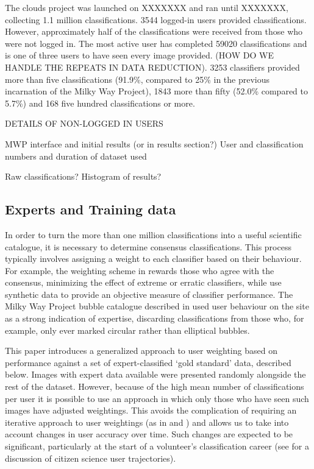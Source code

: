 \documentclass[a4,useAMS,usenatbib]{mn2e}
\begin{document}
The clouds project was launched on XXXXXXX and ran until XXXXXXX, collecting 1.1 million classifications. 3544 logged-in users provided classifications. However, approximately half of the classifications were received from those who were not logged in. The most active user has completed 59020 classifications and is one of three users to have seen every image provided. (HOW DO WE HANDLE THE REPEATS IN DATA REDUCTION). 3253 classifiers provided more than five classifications (91.9\%, compared to 25\% in the previous incarnation of the Milky Way Project), 1843 more than fifty (52.0\% compared to 5.7\%) and 168 five hundred classifications or more. 

DETAILS OF NON-LOGGED IN USERS


MWP interface and initial results (or in results section?)
User and classification numbers and duration of dataset used

Raw classifications?
Histogram of results?


\subsection{Experts and Training data}

In order to turn the more than one million classifications into a useful scientific catalogue, it is necessary to determine consensus classifications. This process typically involves assigning a weight to each classifier based on their behaviour. For example, the weighting scheme in \citet{Lintott} rewards those who agree with the consensus, minimizing the effect of extreme or erratic classifiers, while \citet{Schwamb} use synthetic data to provide an objective measure of classifier performance. The Milky Way Project bubble catalogue described in \citet{Simpson} used user behaviour on the site as a strong indication of expertise, discarding classifications from those who, for example, only ever marked circular rather than elliptical bubbles. 

This paper introduces a generalized approach to user weighting based on performance against a set of expert-classified `gold standard' data, described below. Images with expert data available were presented randomly alongside the rest of the dataset. However, because of the high mean number of classifications per user it is possible to use an approach in which only those who have seen such images have adjusted weightings. This avoids the complication of requiring an iterative approach to user weightings (as in \citet{Lintott} and \citet{Schwamb}) and allows us to take into account changes in user accuracy over time. Such changes are expected to be significant, particularly at the start of a volunteer's classification career (see \citet{EdwinSimpson} for a discussion of citizen science user trajectories). 
\end{document}
